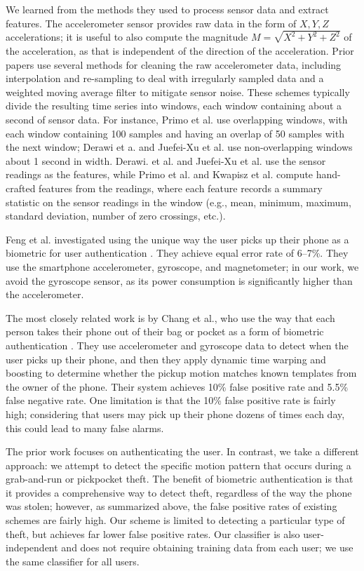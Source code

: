 \documentclass{soups}
\begin{document}
We learned from the methods they used to process sensor data and extract features.
The accelerometer sensor provides raw data in the form of $X,Y,Z$ accelerations; it is useful to also compute the magnitude $M=\sqrt{X^2+Y^2+Z^2}$ of the acceleration, as that is independent of the direction of the acceleration.
Prior papers use several methods for cleaning the raw accelerometer data, including interpolation and re-sampling to deal with irregularly sampled data and a weighted moving average filter to mitigate sensor noise.
These schemes typically divide the resulting time series into windows, each window containing about a second of sensor data.
For instance, Primo et al. use overlapping windows, with each window containing 100 samples and having an overlap of 50 samples with the next window; Derawi et a. and Juefei-Xu et al. use non-overlapping windows about 1 second in width.
Derawi. et al. and Juefei-Xu et al. use the sensor readings as the features, while Primo et al. and Kwapisz et al. compute hand-crafted features from the readings, where each feature records a summary statistic on the sensor readings in the window (e.g., mean, minimum, maximum, standard deviation, number of zero crossings, etc.).

Feng et al. investigated using the unique way the user picks up their phone as a biometric for user authentication \cite{feng:pickup}. 
They achieve equal error rate of 6--7\%.
They use the smartphone accelerometer, gyroscope, and magnetometer; in our work, we avoid the gyroscope sensor, as its power consumption is significantly higher than the accelerometer.

The most closely related work is by Chang et al., who use the way
that each person takes their phone out of their bag or pocket as a 
form of biometric authentication \cite{cheng:theft}.
They use accelerometer and gyroscope data to detect when the user picks
up their phone, and then they apply dynamic time warping and boosting to
determine whether the pickup motion matches known templates from the
owner of the phone.
Their system achieves 10\% false positive rate and 5.5\% false negative rate.
One limitation is that the 10\% false positive rate is fairly high;
considering that users may pick up their phone dozens of times each day,
this could lead to many false alarms.

The prior work focuses on authenticating the user.
In contrast, we take a different approach: we attempt to detect the
specific motion pattern that occurs during a grab-and-run or pickpocket theft.
The benefit of biometric authentication is that it provides a comprehensive
way to detect theft, regardless of the way the phone was stolen; however,
as summarized above, the false positive rates of existing schemes
are fairly high.
Our scheme is limited to detecting a particular type of theft, but achieves
far lower false positive rates.
Our classifier is also user-independent and does not require obtaining
training data from each user; we use the same classifier for all users.
\end{document}
